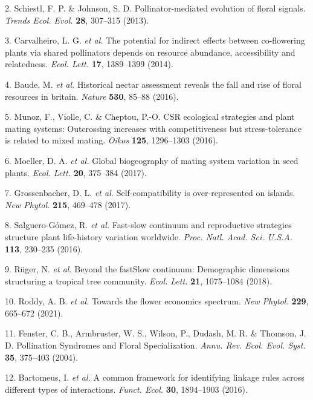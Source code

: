 \documentclass[12pt,a4paper,]{article}
\begin{document}
\hypertarget{ref-schiestl2013}{}
2. Schiestl, F. P. \& Johnson, S. D. Pollinator-mediated evolution of
floral signals. \emph{Trends Ecol. Evol.} \textbf{28}, 307--315 (2013).

\hypertarget{ref-carvalheiro2014}{}
3. Carvalheiro, L. G. \emph{et al.} The potential for indirect effects
between co-flowering plants via shared pollinators depends on resource
abundance, accessibility and relatedness. \emph{Ecol. Lett.}
\textbf{17}, 1389--1399 (2014).

\hypertarget{ref-baude2016}{}
4. Baude, M. \emph{et al.} Historical nectar assessment reveals the fall
and rise of floral resources in britain. \emph{Nature} \textbf{530},
85--88 (2016).

\hypertarget{ref-munoz2016}{}
5. Munoz, F., Violle, C. \& Cheptou, P.-O. CSR ecological strategies and
plant mating systems: Outcrossing increases with competitiveness but
stress-tolerance is related to mixed mating. \emph{Oikos} \textbf{125},
1296--1303 (2016).

\hypertarget{ref-moeller2017}{}
6. Moeller, D. A. \emph{et al.} Global biogeography of mating system
variation in seed plants. \emph{Ecol. Lett.} \textbf{20}, 375--384
(2017).

\hypertarget{ref-grossenbacher2017}{}
7. Grossenbacher, D. L. \emph{et al.} Self-compatibility is
over-represented on islands. \emph{New Phytol.} \textbf{215}, 469--478
(2017).

\hypertarget{ref-salguero2016}{}
8. Salguero-Gómez, R. \emph{et al.} Fast-slow continuum and reproductive
strategies structure plant life-history variation worldwide. \emph{Proc.
Natl. Acad. Sci. U.S.A.} \textbf{113}, 230--235 (2016).

\hypertarget{ref-ruger2018}{}
9. Rüger, N. \emph{et al.} Beyond the fastSlow continuum: Demographic
dimensions structuring a tropical tree community. \emph{Ecol. Lett.}
\textbf{21}, 1075--1084 (2018).

\hypertarget{ref-roddy2021}{}
10. Roddy, A. B. \emph{et al.} Towards the flower economics spectrum.
\emph{New Phytol.} \textbf{229}, 665--672 (2021).

\hypertarget{ref-fenster2004}{}
11. Fenster, C. B., Armbruster, W. S., Wilson, P., Dudash, M. R. \&
Thomson, J. D. Pollination Syndromes and Floral Specialization.
\emph{Annu. Rev. Ecol. Evol. Syst.} \textbf{35}, 375--403 (2004).

\hypertarget{ref-bartomeus2016}{}
12. Bartomeus, I. \emph{et al.} A common framework for identifying
linkage rules across different types of interactions. \emph{Funct.
Ecol.} \textbf{30}, 1894--1903 (2016).
\end{document}
